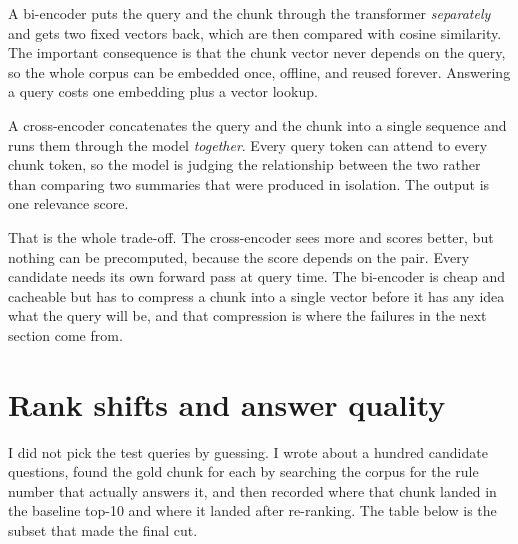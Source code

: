 \documentclass[11pt,a4paper]{article}
\begin{document}
A bi-encoder puts the query and the chunk through the transformer \emph{separately} and gets
two fixed vectors back, which are then compared with cosine similarity. The important
consequence is that the chunk vector never depends on the query, so the whole corpus can be
embedded once, offline, and reused forever. Answering a query costs one embedding plus a vector
lookup.

A cross-encoder concatenates the query and the chunk into a single sequence and runs them
through the model \emph{together}. Every query token can attend to every chunk token, so the
model is judging the relationship between the two rather than comparing two summaries that were
produced in isolation. The output is one relevance score.

That is the whole trade-off. The cross-encoder sees more and scores better, but nothing can be
precomputed, because the score depends on the pair. Every candidate needs its own forward pass
at query time. The bi-encoder is cheap and cacheable but has to compress a chunk into a single
vector before it has any idea what the query will be, and that compression is where the failures
in the next section come from.

\section{Rank shifts and answer quality}

I did not pick the test queries by guessing. I wrote about a hundred candidate questions, found
the gold chunk for each by searching the corpus for the rule number that actually answers it,
and then recorded where that chunk landed in the baseline top-10 and where it landed after
re-ranking. The table below is the subset that made the final cut.
\end{document}

